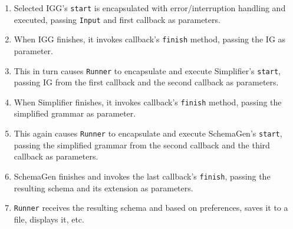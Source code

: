 \documentclass[a4paper,10pt,oneside]{article}
\newcommand{\code}[1]{\texttt{#1}}
\begin{document}
\begin{enumerate}
	\item Selected IGG's \code{start} is encapsulated with error/interruption handling and executed, passing \code{Input} and first callback as parameters.
	\item When IGG finishes, it invokes callback's \code{finish} method, passing the IG as parameter.
	\item This in turn causes \code{Runner} to encapsulate and execute Simplifier's \code{start}, passing IG from the first callback and the second callback as parameters.
	\item When Simplifier finishes, it invokes callback's \code{finish} method, passing the simplified grammar as parameter.
	\item This again causes \code{Runner} to encapsulate and execute SchemaGen's \code{start}, passing the simplified grammar from the second callback and the third callback as parameters.
	\item SchemaGen finishes and invokes the last callback's \code{finish}, passing the resulting schema and its extension as parameters.
	\item \code{Runner} receives the resulting schema and based on preferences, saves it to a file, displays it, etc.
\end{enumerate}


\nocite{*}


\end{document}
